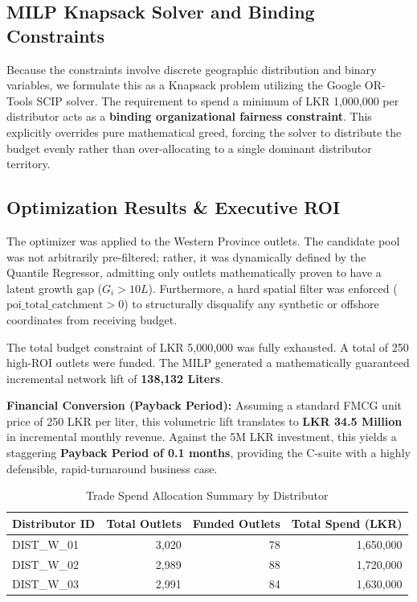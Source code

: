\documentclass[10pt,a4paper]{article}
\begin{document}
\subsection{MILP Knapsack Solver and Binding Constraints}
Because the constraints involve discrete geographic distribution and binary variables, we formulate this as a Knapsack problem utilizing the Google OR-Tools SCIP solver. The requirement to spend a minimum of LKR 1,000,000 per distributor acts as a \textbf{binding organizational fairness constraint}. This explicitly overrides pure mathematical greed, forcing the solver to distribute the budget evenly rather than over-allocating to a single dominant distributor territory.

\subsection{Optimization Results \& Executive ROI}
The optimizer was applied to the Western Province outlets. The candidate pool was not arbitrarily pre-filtered; rather, it was dynamically defined by the Quantile Regressor, admitting only outlets mathematically proven to have a latent growth gap ($G_i > 10L$). Furthermore, a hard spatial filter was enforced ($\text{poi\_total\_catchment} > 0$) to structurally disqualify any synthetic or offshore coordinates from receiving budget. 

The total budget constraint of LKR 5,000,000 was fully exhausted. A total of 250 high-ROI outlets were funded. The MILP generated a mathematically guaranteed incremental network lift of \textbf{138,132 Liters}. 

\textbf{Financial Conversion (Payback Period):} Assuming a standard FMCG unit price of 250 LKR per liter, this volumetric lift translates to \textbf{LKR 34.5 Million} in incremental monthly revenue. Against the 5M LKR investment, this yields a staggering \textbf{Payback Period of 0.1 months}, providing the C-suite with a highly defensible, rapid-turnaround business case.

\begin{table}[H]
    \centering
    \caption{Trade Spend Allocation Summary by Distributor}
    \begin{tabular}{lrrr}
        \toprule
        \textbf{Distributor ID} & \textbf{Total Outlets} & \textbf{Funded Outlets} & \textbf{Total Spend (LKR)} \\
        \midrule
        DIST\_W\_01 & 3,020 & 78 & 1,650,000 \\
        DIST\_W\_02 & 2,989 & 88 & 1,720,000 \\
        DIST\_W\_03 & 2,991 & 84 & 1,630,000 \\
        \bottomrule
    \end{tabular}
    \label{tab:optim_results}
\end{table}
\end{document}
